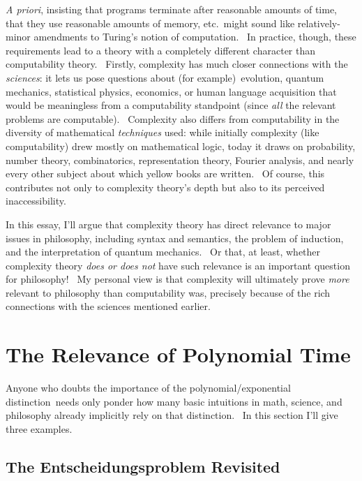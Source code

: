 \documentclass[12pt,onecolumn]{article}%
\begin{document}
\textit{A priori}, insisting that programs terminate after reasonable amounts
of time, that they use reasonable amounts of memory, etc.\ might sound like
relatively-minor amendments to Turing's notion of computation. \ In practice,
though, these requirements lead to a theory with a completely different
character than computability theory. \ Firstly, complexity has much closer
connections with the \textit{sciences}: it lets us pose questions about (for
example)\ evolution, quantum mechanics, statistical physics, economics, or
human language acquisition that would be meaningless from a computability
standpoint (since \textit{all} the relevant problems are computable).
\ Complexity also differs from computability in the diversity of mathematical
\textit{techniques} used: while initially complexity (like computability) drew
mostly on mathematical logic, today it draws on probability, number theory,
combinatorics, representation theory, Fourier analysis, and nearly every other
subject about which yellow books are written. \ Of course, this contributes
not only to complexity theory's depth but also to its perceived inaccessibility.

In this essay, I'll argue that complexity theory has direct relevance to major
issues in philosophy, including syntax and semantics, the problem of
induction, and the interpretation of quantum mechanics. \ Or that, at least,
whether complexity theory \textit{does or does not} have such relevance is an
important question for philosophy! \ My personal view is that complexity will
ultimately prove \textit{more} relevant to philosophy than computability was,
precisely because of the rich connections with the sciences mentioned earlier.

\section{The Relevance of Polynomial Time\label{CTP}}

Anyone who doubts the importance of the polynomial/exponential
distinction\ needs only ponder how many basic intuitions in math, science, and
philosophy already implicitly rely on that distinction. \ In this section I'll
give three examples.

\subsection{The Entscheidungsproblem Revisited\label{ENTSCH}}
\end{document}
